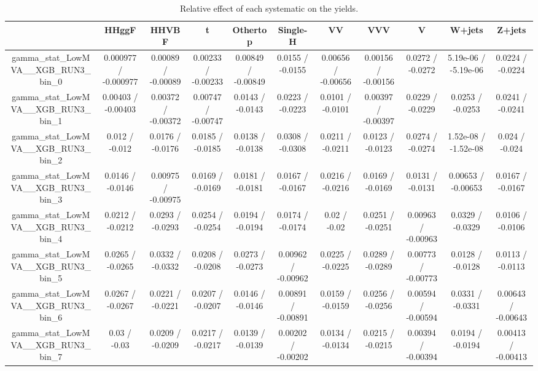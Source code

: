 \documentclass[10pt]{article}
\begin{document}
\begin{table}[htbp]
\begin{center}
\begin{tabular}{|c|c|c|c|c|c|c|c|c|c|c|}
\hline 
      & HHggF      & HHVBF      & t      & Othertop      & Single-H      & VV      & VVV      & V      & W+jets      & Z+jets \\ 
\hline 
  gamma_stat_LowMVA__XGB_RUN3_bin_0 & 0.000977 / -0.000977 & 0.00089 / -0.00089 & 0.00233 / -0.00233 & 0.00849 / -0.00849 & 0.0155 / -0.0155 & 0.00656 / -0.00656 & 0.00156 / -0.00156 & 0.0272 / -0.0272 & 5.19e-06 / -5.19e-06 & 0.0224 / -0.0224 \\ 
  gamma_stat_LowMVA__XGB_RUN3_bin_1 & 0.00403 / -0.00403 & 0.00372 / -0.00372 & 0.00747 / -0.00747 & 0.0143 / -0.0143 & 0.0223 / -0.0223 & 0.0101 / -0.0101 & 0.00397 / -0.00397 & 0.0229 / -0.0229 & 0.0253 / -0.0253 & 0.0241 / -0.0241 \\ 
  gamma_stat_LowMVA__XGB_RUN3_bin_2 & 0.012 / -0.012 & 0.0176 / -0.0176 & 0.0185 / -0.0185 & 0.0138 / -0.0138 & 0.0308 / -0.0308 & 0.0211 / -0.0211 & 0.0123 / -0.0123 & 0.0274 / -0.0274 & 1.52e-08 / -1.52e-08 & 0.024 / -0.024 \\ 
  gamma_stat_LowMVA__XGB_RUN3_bin_3 & 0.0146 / -0.0146 & 0.00975 / -0.00975 & 0.0169 / -0.0169 & 0.0181 / -0.0181 & 0.0167 / -0.0167 & 0.0216 / -0.0216 & 0.0169 / -0.0169 & 0.0131 / -0.0131 & 0.00653 / -0.00653 & 0.0167 / -0.0167 \\ 
  gamma_stat_LowMVA__XGB_RUN3_bin_4 & 0.0212 / -0.0212 & 0.0293 / -0.0293 & 0.0254 / -0.0254 & 0.0194 / -0.0194 & 0.0174 / -0.0174 & 0.02 / -0.02 & 0.0251 / -0.0251 & 0.00963 / -0.00963 & 0.0329 / -0.0329 & 0.0106 / -0.0106 \\ 
  gamma_stat_LowMVA__XGB_RUN3_bin_5 & 0.0265 / -0.0265 & 0.0332 / -0.0332 & 0.0208 / -0.0208 & 0.0273 / -0.0273 & 0.00962 / -0.00962 & 0.0225 / -0.0225 & 0.0289 / -0.0289 & 0.00773 / -0.00773 & 0.0128 / -0.0128 & 0.0113 / -0.0113 \\ 
  gamma_stat_LowMVA__XGB_RUN3_bin_6 & 0.0267 / -0.0267 & 0.0221 / -0.0221 & 0.0207 / -0.0207 & 0.0146 / -0.0146 & 0.00891 / -0.00891 & 0.0159 / -0.0159 & 0.0256 / -0.0256 & 0.00594 / -0.00594 & 0.0331 / -0.0331 & 0.00643 / -0.00643 \\ 
  gamma_stat_LowMVA__XGB_RUN3_bin_7 & 0.03 / -0.03 & 0.0209 / -0.0209 & 0.0217 / -0.0217 & 0.0139 / -0.0139 & 0.00202 / -0.00202 & 0.0134 / -0.0134 & 0.0215 / -0.0215 & 0.00394 / -0.00394 & 0.0194 / -0.0194 & 0.00413 / -0.00413 \\ 
\hline 
\end{tabular} 
\caption{Relative effect of each systematic on the yields.} 
\end{center} 
\end{table} 
\end{document}
